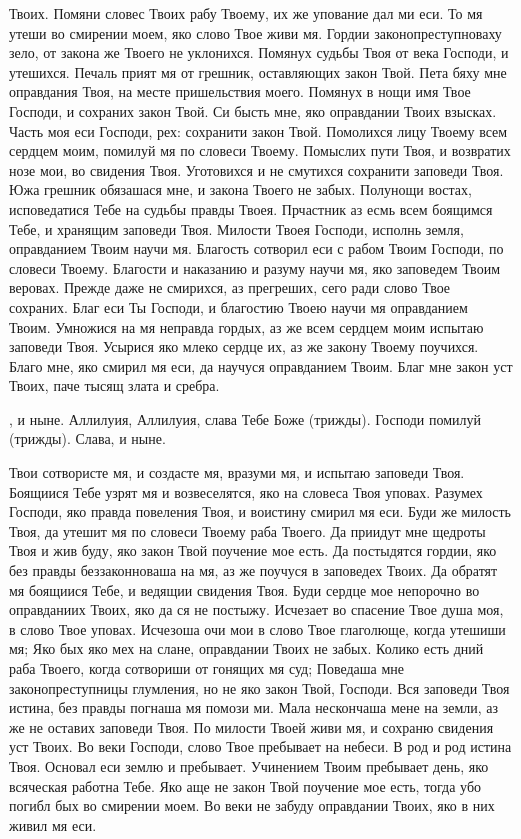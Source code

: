 Твоих. Помяни словес Твоих рабу Твоему, их же упование дал ми еси. То мя утеши во смирении моем, яко слово Твое живи мя. Гордии законопреступноваху зело, от закона же Твоего не уклонихся. Помянух судьбы Твоя от века Господи, и утешихся. Печаль прият мя от грешник, оставляющих закон Твой. Пета бяху мне оправдания Твоя, на месте пришельствия моего. Помянух в нощи имя Твое Господи, и сохраних закон Твой. Си бысть мне, яко оправдании Твоих взысках. Часть моя еси Господи, рех: сохранити закон Твой. Помолихся лицу Твоему всем сердцем моим, помилуй мя по словеси Твоему. Помыслих пути Твоя, и возвратих нозе мои, во свидения Твоя. Уготовихся и не смутихся сохранити заповеди Твоя. Южа грешник обязашася мне, и закона Твоего не забых. Полунощи востах, исповедатися Тебе на судьбы правды Твоея. Прчастник аз есмь всем боящимся Тебе, и хранящим заповеди Твоя. Милости Твоея Господи, исполнь земля, оправданием Твоим научи мя. Благость сотворил еси с рабом Твоим Господи, по словеси Твоему. Благости и наказанию и разуму научи мя, яко заповедем Твоим веровах. Прежде даже не смирихся, аз прегреших, сего ради слово Твое сохраних. Благ еси Ты Господи, и благостию Твоею научи мя оправданием Твоим. Умножися на мя неправда гордых, аз же всем сердцем моим испытаю заповеди Твоя. Усырися яко млеко сердце их, аз же закону Твоему поучихся. Благо мне, яко смирил мя еси, да научуся оправданием Твоим. Благ мне закон уст Твоих, паче тысящ злата и сребра.


, и ныне. Аллилуия, Аллилуия, слава Тебе Боже (трижды). Господи помилуй (трижды). Слава, и ныне.


 Твои сотвористе мя, и создасте мя, вразуми мя, и испытаю заповеди Твоя. Боящиися Тебе узрят мя и возвеселятся, яко на словеса Твоя уповах. Разумех Господи, яко правда повеления Твоя, и воистину смирил мя еси. Буди же милость Твоя, да утешит мя по словеси Твоему раба Твоего. Да приидут мне щедроты Твоя и жив буду, яко закон Твой поучение мое есть. Да постыдятся гордии, яко без правды беззаконноваша на мя, аз же поучуся в заповедех Твоих. Да обратят мя боящиися Тебе, и ведящии свидения Твоя. Буди сердце мое непорочно во оправданиих Твоих, яко да ся не постыжу. Исчезает во спасение Твое душа моя, в слово Твое уповах. Исчезоша очи мои в слово Твое глаголюще, когда утешиши мя; Яко бых яко мех на слане, оправдании Твоих не забых. Колико есть дний раба Твоего, когда сотвориши от гонящих мя суд; Поведаша мне законопреступницы глумления, но не яко закон Твой, Господи. Вся заповеди Твоя истина, без правды погнаша мя помози ми. Мала нескончаша мене на земли, аз же не оставих заповеди Твоя. По милости Твоей живи мя, и сохраню свидения уст Твоих. Во веки Господи, слово Твое пребывает на небеси. В род и род истина Твоя. Основал еси землю и пребывает. Учинением Твоим пребывает день, яко всяческая работна Тебе. Яко аще не закон Твой поучение мое есть, тогда убо погибл бых во смирении моем. Во веки не забуду оправдании Твоих, яко в них живил мя еси.

